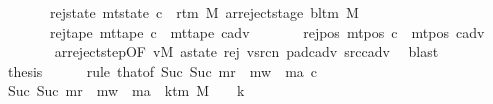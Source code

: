 \begin{isabellebody}
\ \ \ \ \ \ \ rej{\isacharunderscore}{\kern0pt}state{\isacharcolon}{\kern0pt}\ {\isachardoublequoteopen}mt{\isacharunderscore}{\kern0pt}state\ c{\isacharprime}{\kern0pt}{\isacharprime}{\kern0pt}\ {\isacharequal}{\kern0pt}\ {\isacharparenleft}{\kern0pt}r{\isacharunderscore}{\kern0pt}tm\ M{\isacharcomma}{\kern0pt}\ ar{\isacharunderscore}{\kern0pt}reject{\isacharunderscore}{\kern0pt}stage\ {\isacharparenleft}{\kern0pt}bl{\isacharunderscore}{\kern0pt}tm\ M{\isacharparenright}{\kern0pt}{\isacharparenright}{\kern0pt}{\isachardoublequoteclose}\isanewline
\ \ \ \ \ \ \ rej{\isacharunderscore}{\kern0pt}tape{\isacharcolon}{\kern0pt}\ {\isachardoublequoteopen}mt{\isacharunderscore}{\kern0pt}tape\ c{\isacharprime}{\kern0pt}{\isacharprime}{\kern0pt}\ {\isacharequal}{\kern0pt}\ mt{\isacharunderscore}{\kern0pt}tape\ c{\isacharunderscore}{\kern0pt}adv{\isachardoublequoteclose}\isanewline
\ \ \ \ \ \ \ rej{\isacharunderscore}{\kern0pt}pos{\isacharcolon}{\kern0pt}\ {\isachardoublequoteopen}mt{\isacharunderscore}{\kern0pt}pos\ c{\isacharprime}{\kern0pt}{\isacharprime}{\kern0pt}\ {\isacharequal}{\kern0pt}\ mt{\isacharunderscore}{\kern0pt}pos\ c{\isacharunderscore}{\kern0pt}adv{\isachardoublequoteclose}\isanewline
\ \ \ \ \ \ \isamarkupfalse%
\ ar{\isacharunderscore}{\kern0pt}reject{\isacharunderscore}{\kern0pt}step{\isacharbrackleft}{\kern0pt}OF\ vM\ a{\isacharunderscore}{\kern0pt}state\ rej\ vsrc{\isacharunderscore}{\kern0pt}n\ pad{\isacharunderscore}{\kern0pt}cadv\ src{\isacharunderscore}{\kern0pt}cadv{\isacharbrackright}{\kern0pt}\ \isamarkupfalse%
\ blast\isanewline
\ \ \ \ \isamarkupfalse%
\ thesis\isanewline
\ \ \ \ \isamarkupfalse%
\ {\isacharparenleft}{\kern0pt}rule\ that{\isacharbrackleft}{\kern0pt}of\ {\isachardoublequoteopen}Suc\ {\isacharparenleft}{\kern0pt}Suc\ m{\isacharunderscore}{\kern0pt}r\ {\isacharplus}{\kern0pt}\ m{\isacharunderscore}{\kern0pt}w\ {\isacharplus}{\kern0pt}\ m{\isacharunderscore}{\kern0pt}a{\isacharparenright}{\kern0pt}{\isachardoublequoteclose}\ c{\isacharprime}{\kern0pt}{\isacharprime}{\kern0pt}{\isacharbrackright}{\kern0pt}{\isacharparenright}{\kern0pt}\isanewline
\ \ \ \ \ \ \isamarkupfalse%
\ {\isachardoublequoteopen}Suc\ {\isacharparenleft}{\kern0pt}Suc\ m{\isacharunderscore}{\kern0pt}r\ {\isacharplus}{\kern0pt}\ m{\isacharunderscore}{\kern0pt}w\ {\isacharplus}{\kern0pt}\ m{\isacharunderscore}{\kern0pt}a{\isacharparenright}{\kern0pt}\ {\isasymle}\ k{\isacharunderscore}{\kern0pt}tm\ M\ {\isacharasterisk}{\kern0pt}\ {\isacharparenleft}{\kern0pt}{}\ {\isacharasterisk}{\kern0pt}\ {\isacharquery}{\kern0pt}k\ {\isacharplus}{\kern0pt}\ {}{\isacharparenright}{\kern0pt}\ {\isacharplus}{\kern0pt}\ {}{\isachardoublequoteclose}\isanewline

\end{isabellebody}
